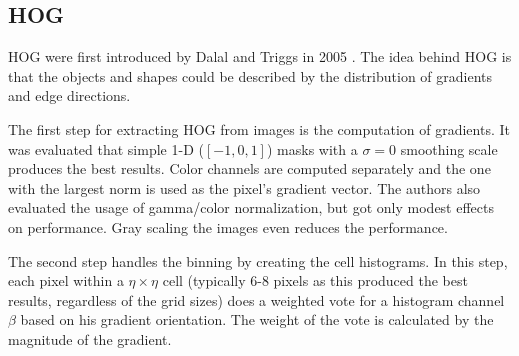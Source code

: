 \subsection{\acf*{HOG}}
\label{sec:hog}

\ac{HOG} were first introduced by Dalal and Triggs in 2005 \cite{Dalal2005}. The idea behind \ac{HOG} is that the objects and shapes could be described by the distribution of gradients and edge directions.

The first step for extracting \ac{HOG} from images is the computation of gradients. It was evaluated that simple 1-D ($[-1, 0, 1]$) masks with a $\sigma = 0$ smoothing scale produces the best results. Color channels are computed separately and the one with the largest norm is used as the pixel's gradient vector. The authors also evaluated the usage of gamma/color normalization, but got only modest effects on performance. Gray scaling the images even reduces the performance.

The second step handles the binning by creating the cell histograms. In this step, each pixel within a $\eta \times \eta$ cell (typically 6-8 pixels as this produced the best results, regardless of the grid sizes) does a weighted vote for a histogram channel $\beta$ based on his gradient orientation. The weight of the vote is calculated by the magnitude of the gradient.

